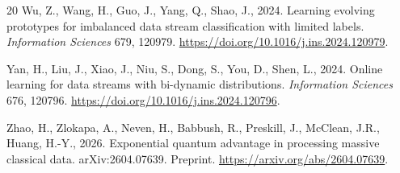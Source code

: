 \documentclass[preprint,12pt,authoryear]{elsarticle}
\begin{document}
\begin{thebibliography}{20}
Wu, Z., Wang, H., Guo, J., Yang, Q., Shao, J., 2024.
\newblock Learning evolving prototypes for imbalanced data stream classification with limited labels.
\newblock \emph{Information Sciences} 679, 120979.
\newblock \url{https://doi.org/10.1016/j.ins.2024.120979}.

Yan, H., Liu, J., Xiao, J., Niu, S., Dong, S., You, D., Shen, L., 2024.
\newblock Online learning for data streams with bi-dynamic distributions.
\newblock \emph{Information Sciences} 676, 120796.
\newblock \url{https://doi.org/10.1016/j.ins.2024.120796}.

Zhao, H., Zlokapa, A., Neven, H., Babbush, R., Preskill, J., McClean, J.R., Huang, H.-Y., 2026.
\newblock Exponential quantum advantage in processing massive classical data.
\newblock arXiv:2604.07639. Preprint.
\newblock \url{https://arxiv.org/abs/2604.07639}.

\end{thebibliography}
\end{document}
